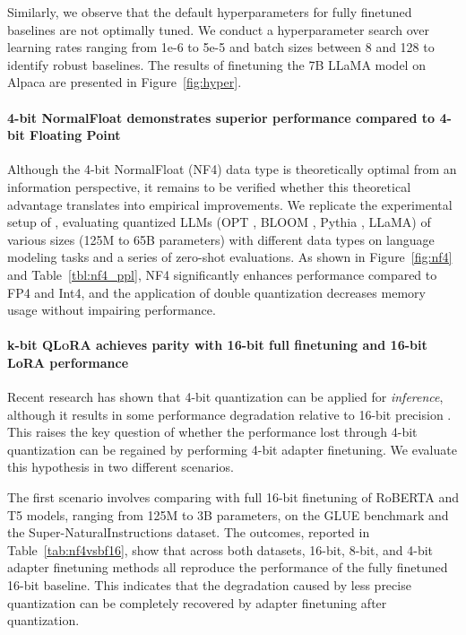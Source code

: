Similarly, we observe that the default hyperparameters for fully finetuned baselines are not optimally tuned. We conduct a hyperparameter search over learning rates ranging from 1e-6 to 5e-5 and batch sizes between 8 and 128 to identify robust baselines. The results of finetuning the 7B LLaMA model on Alpaca are presented in Figure~\ref{fig:hyper}.

\paragraph{4-bit NormalFloat demonstrates superior performance compared to 4-bit Floating Point}

Although the 4-bit NormalFloat (NF4) data type is theoretically optimal from an information perspective, it remains to be verified whether this theoretical advantage translates into empirical improvements. We replicate the experimental setup of \citet{dettmers2022case}, evaluating quantized LLMs (OPT \citep{zhang2022opt}, BLOOM \cite{scao2022bloom}, Pythia \cite{biderman2023pythia}, LLaMA) of various sizes (125M to 65B parameters) with different data types on language modeling tasks and a series of zero-shot evaluations. As shown in Figure~\ref{fig:nf4} and Table~\ref{tbl:nf4_ppl}, NF4 significantly enhances performance compared to FP4 and Int4, and the application of double quantization decreases memory usage without impairing performance.

\paragraph{k-bit \textsc{QLoRA} achieves parity with 16-bit full finetuning and 16-bit LoRA performance} Recent research has shown that 4-bit quantization can be applied for \emph{inference}, although it results in some performance degradation relative to 16-bit precision \citep{dettmers2022case,frantar2022gptq}. This raises the key question of whether the performance lost through 4-bit quantization can be regained by performing 4-bit adapter finetuning. We evaluate this hypothesis in two different scenarios.

The first scenario involves comparing with full 16-bit finetuning of RoBERTA and T5 models, ranging from 125M to 3B parameters, on the GLUE benchmark and the Super-NaturalInstructions dataset. The outcomes, reported in Table~\ref{tab:nf4vsbf16}, show that across both datasets, 16-bit, 8-bit, and 4-bit adapter finetuning methods all reproduce the performance of the fully finetuned 16-bit baseline. This indicates that the degradation caused by less precise quantization can be completely recovered by adapter finetuning after quantization.

